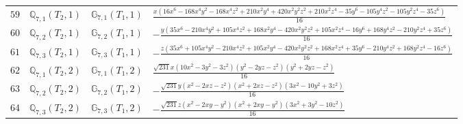 \documentclass[fleqn,8pt,landscape]{jsarticle}
\begin{document}
\begin{table}[ht!]
\begin{center}
\begin{tabular}{cccl}
$ 59 $ & $ \mathbb{Q}_{7,1}(T_{2},1) $ & $ \mathbb{G}_{7,1}(T_{1},1) $ & $ \frac{x \left(16 x^{6} - 168 x^{4} y^{2} - 168 x^{4} z^{2} + 210 x^{2} y^{4} + 420 x^{2} y^{2} z^{2} + 210 x^{2} z^{4} - 35 y^{6} - 105 y^{4} z^{2} - 105 y^{2} z^{4} - 35 z^{6}\right)}{16} $ \\
$ 60 $ & $ \mathbb{Q}_{7,2}(T_{2},1) $ & $ \mathbb{G}_{7,2}(T_{1},1) $ & $ - \frac{y \left(35 x^{6} - 210 x^{4} y^{2} + 105 x^{4} z^{2} + 168 x^{2} y^{4} - 420 x^{2} y^{2} z^{2} + 105 x^{2} z^{4} - 16 y^{6} + 168 y^{4} z^{2} - 210 y^{2} z^{4} + 35 z^{6}\right)}{16} $ \\
$ 61 $ & $ \mathbb{Q}_{7,3}(T_{2},1) $ & $ \mathbb{G}_{7,3}(T_{1},1) $ & $ - \frac{z \left(35 x^{6} + 105 x^{4} y^{2} - 210 x^{4} z^{2} + 105 x^{2} y^{4} - 420 x^{2} y^{2} z^{2} + 168 x^{2} z^{4} + 35 y^{6} - 210 y^{4} z^{2} + 168 y^{2} z^{4} - 16 z^{6}\right)}{16} $ \\
$ 62 $ & $ \mathbb{Q}_{7,1}(T_{2},2) $ & $ \mathbb{G}_{7,1}(T_{1},2) $ & $ \frac{\sqrt{231} x \left(10 x^{2} - 3 y^{2} - 3 z^{2}\right) \left(y^{2} - 2 y z - z^{2}\right) \left(y^{2} + 2 y z - z^{2}\right)}{16} $ \\
$ 63 $ & $ \mathbb{Q}_{7,2}(T_{2},2) $ & $ \mathbb{G}_{7,2}(T_{1},2) $ & $ - \frac{\sqrt{231} y \left(x^{2} - 2 x z - z^{2}\right) \left(x^{2} + 2 x z - z^{2}\right) \left(3 x^{2} - 10 y^{2} + 3 z^{2}\right)}{16} $ \\
$ 64 $ & $ \mathbb{Q}_{7,3}(T_{2},2) $ & $ \mathbb{G}_{7,3}(T_{1},2) $ & $ - \frac{\sqrt{231} z \left(x^{2} - 2 x y - y^{2}\right) \left(x^{2} + 2 x y - y^{2}\right) \left(3 x^{2} + 3 y^{2} - 10 z^{2}\right)}{16} $ \\
 \hline \hline
\end{tabular}
\end{center}
\end{table}
\end{document}
